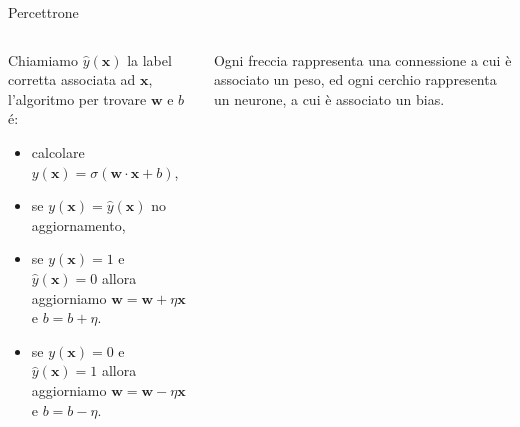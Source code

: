 \documentclass[aspectratio=169]{beamer}
\begin{document}
\begin{frame}{Percettrone}
    \begin{columns}
        \begin{column}{0.5\textwidth}
            Chiamiamo $\hat{y}(\mathbf{x})$ la label corretta associata ad $\mathbf{x}$, l'algoritmo per trovare $\mathbf{w}$ e $b$ \'e:
            \begin{itemize}
                \item calcolare $y(\mathbf{x}) = \sigma\left(\mathbf{w}\cdot \mathbf{x} + b\right) $, 
                \item se $y(\mathbf{x}) = \hat{y}(\mathbf{x})$ no aggiornamento,
                \item se $y(\mathbf{x})=1 $ e $\hat{y}(\mathbf{x}) = 0$ allora aggiorniamo $\mathbf{w} = \mathbf{w} + \eta \mathbf{x}$ e $b = b + \eta$.
                \item se $y(\mathbf{x})=0 $ e $\hat{y}(\mathbf{x}) = 1$ allora aggiorniamo $\mathbf{w} = \mathbf{w} - \eta \mathbf{x}$ e $b = b - \eta$.
            \end{itemize}
        \end{column}
        \pause
        \begin{column}{0.5\textwidth}

            Ogni freccia rappresenta una connessione a cui è associato un peso, ed ogni cerchio rappresenta un neurone, a cui è associato un bias.
        \end{column}
    \end{columns}
\end{frame}
\end{document}
